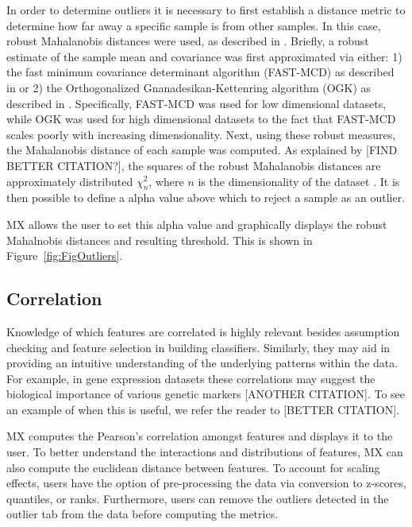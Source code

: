 \documentclass[12pt]{article}
\begin{document}
In order to determine outliers it is necessary to first establish a distance metric to determine how far away a specific sample is from other samples. In this case, robust Mahalanobis distances were used, as described in \cite{hubert2008high}. Briefly, a robust estimate of the sample mean and covariance was first approximated via either: 1) the fast minimum covariance determinant algorithm (FAST-MCD) as described in \cite{rousseeuw1999fast} or 2) the Orthogonalized Gnanadesikan-Kettenring algorithm (OGK) as described in \cite{maronna2002robust}. Specifically, FAST-MCD was used for low dimensional datasets, while OGK was used for high dimensional datasets to the fact that FAST-MCD scales poorly with increasing dimensionality. Next, using these robust measures, the Mahalanobis distance of each sample was computed. As explained by \cite{hardin2012distribution} [FIND BETTER CITATION?], the squares of the robust Mahalanobis distances are approximately distributed $\chi^2_n$, where $n$ is the dimensionality of the dataset . It is then possible to define a alpha value above which to reject a sample as an outlier. 

MX allows the user to set this alpha value and graphically displays the robust Mahalnobis distances and resulting threshold. This is shown in Figure~\ref{fig:FigOutliers}.

\subsection{Correlation}
\label{subsec:SubSecCorrelation}

Knowledge of which features are correlated is highly relevant besides assumption checking and feature selection in building classifiers. Similarly, they may aid in providing an intuitive understanding of the underlying patterns within the data. For example, in gene expression datasets these correlations may suggest the biological importance of various genetic markers [ANOTHER CITATION]. To see an example of when this is useful, we refer the reader to \cite{shi2012unsupervised} [BETTER CITATION].

MX computes the Pearson's correlation amongst features and displays it to the user. To better understand the interactions and distributions of features, MX can also compute the euclidean distance between features. To account for scaling effects, users have the option of pre-processing the data via conversion to z-scores, quantiles, or ranks. Furthermore, users can remove the outliers detected in the outlier tab from the data before computing the metrics. 
\end{document}
